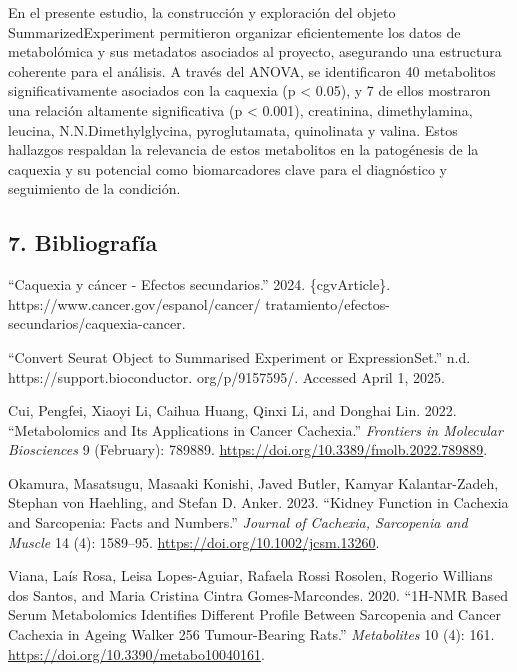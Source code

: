 \documentclass[
]{article}
\newlength{\cslhangindent}
\newenvironment{CSLReferences}[2] %
 {\begin{list}{}{%
  \setlength{\itemindent}{0pt}
  \setlength{\leftmargin}{0pt}
  \setlength{\parsep}{0pt}
  \ifodd #1
   \setlength{\leftmargin}{\cslhangindent}
   \setlength{\itemindent}{-1\cslhangindent}
  \fi
  \setlength{\itemsep}{#2\baselineskip}}}
 {\end{list}}
\begin{document}
En el presente estudio, la construcción y exploración del objeto
SummarizedExperiment permitieron organizar eficientemente los datos de
metabolómica y sus metadatos asociados al proyecto, asegurando una
estructura coherente para el análisis. A través del ANOVA, se
identificaron 40 metabolitos significativamente asociados con la
caquexia (p \textless{} 0.05), y 7 de ellos mostraron una relación
altamente significativa (p \textless{} 0.001), creatinina,
dimethylamina, leucina, N.N.Dimethylglycina, pyroglutamata, quinolinata
y valina. Estos hallazgos respaldan la relevancia de estos metabolitos
en la patogénesis de la caquexia y su potencial como biomarcadores clave
para el diagnóstico y seguimiento de la condición.

\subsection*{7. Bibliografía}\label{bibliografuxeda}

\label{refs}
\begin{CSLReferences}{1}{0}
{``{Caquexia y c{á}ncer - Efectos secundarios}.''} 2024. \{cgvArticle\}.
https://www.cancer.gov/espanol/cancer/
tratamiento/efectos-secundarios/caquexia-cancer.

{``Convert {Seurat Object} to {Summarised Experiment} or
{ExpressionSet}.''} n.d. https://support.bioconductor. org/p/9157595/.
Accessed April 1, 2025.

Cui, Pengfei, Xiaoyi Li, Caihua Huang, Qinxi Li, and Donghai Lin. 2022.
{``Metabolomics and Its {Applications} in {Cancer Cachexia}.''}
\emph{Frontiers in Molecular Biosciences} 9 (February): 789889.
\url{https://doi.org/10.3389/fmolb.2022.789889}.

Okamura, Masatsugu, Masaaki Konishi, Javed Butler, Kamyar
Kalantar-Zadeh, Stephan von Haehling, and Stefan D. Anker. 2023.
{``Kidney Function in Cachexia and Sarcopenia: {Facts} and Numbers.''}
\emph{Journal of Cachexia, Sarcopenia and Muscle} 14 (4): 1589--95.
\url{https://doi.org/10.1002/jcsm.13260}.

Viana, Laís Rosa, Leisa Lopes-Aguiar, Rafaela Rossi Rosolen, Rogerio
Willians dos Santos, and Maria Cristina Cintra Gomes-Marcondes. 2020.
{``{1H-NMR Based Serum Metabolomics Identifies Different Profile}
Between {Sarcopenia} and {Cancer Cachexia} in {Ageing Walker} 256
{Tumour-Bearing Rats}.''} \emph{Metabolites} 10 (4): 161.
\url{https://doi.org/10.3390/metabo10040161}.

\end{CSLReferences}
\end{document}
